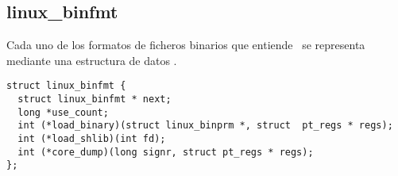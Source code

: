 \subsection*{linux\_binfmt}

Cada uno de los formatos de ficheros binarios que entiende \linux\ se
representa mediante una estructura de datos .
\begin{tscreen}\begin{verbatim}
struct linux_binfmt {
  struct linux_binfmt * next;
  long *use_count;
  int (*load_binary)(struct linux_binprm *, struct  pt_regs * regs);
  int (*load_shlib)(int fd);
  int (*core_dump)(long signr, struct pt_regs * regs);
};
\end{verbatim}\end{tscreen}

